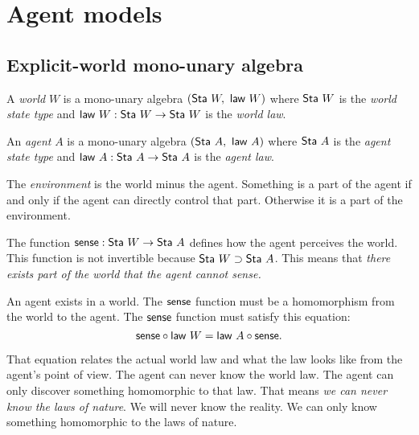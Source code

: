 
\chapter{Agent models}

\newcommand\Sta{\fun{Sta}}
\newcommand\law{\fun{law}}

\section{Explicit-world mono-unary algebra}

A \emph{world} \(W\) is a mono-unary algebra \((\Sta~W, ~ \law~W)\)
where \(\Sta~W\) is the \emph{world state type}
and \(\law~W : \Sta~W \to \Sta~W\) is the \emph{world law}.

An \emph{agent} \(A\) is a mono-unary algebra \((\Sta~A, ~ \law~A)\)
where \(\Sta~A\) is the \emph{agent state type}
and \(\law~A : \Sta~A \to \Sta~A\) is the \emph{agent law}.

The \emph{environment} is the world minus the agent.
Something is a part of the agent if and only if
the agent can directly control that part.
Otherwise it is a part of the environment.

\newcommand\fpenalty{\fun{penalty}}
\newcommand\reward{\fun{reward}}
\newcommand\sense{\fun{sense}}
\newcommand\actuate{\fun{actuate}}

The function \(\sense : \Sta~W \to \Sta~A\)
defines how the agent perceives the world.
This function is not invertible
because \(\Sta~W \supset \Sta~A\).
This means that \emph{there exists part of the world that the agent cannot sense.}

An agent exists in a world.
The \(\sense\) function must be a homomorphism from the world to the agent.
The \(\sense\) function must satisfy this equation:
\begin{equation}
    \sense \circ \law~W = \law~A \circ \sense.
\end{equation}

That equation relates the actual world law
and what the law looks like from the agent's point of view.
The agent can never know the world law.
The agent can only discover something homomorphic to that law.
That means \emph{we can never know the laws of nature}.
We will never know the reality.
We can only know something homomorphic to the laws of nature.

\newcommand\orbit{\fun{orbit}}
\newcommand\Orbit{\fun{Orbit}}
\newcommand\InfSeq{\fun{InfSeq}}
\newcommand\iterate{\fun{iterate}}
\newcommand\judge{\fun{judge}}

